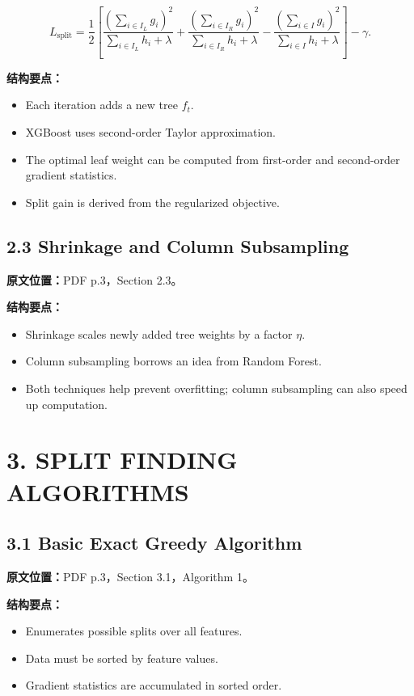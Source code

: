 \[
  L_{\mathrm{split}}
  =
  \frac{1}{2}
  \left[
    \frac{\left(\sum_{i\in I_L}g_i\right)^2}{\sum_{i\in I_L}h_i+\lambda}
    +
    \frac{\left(\sum_{i\in I_R}g_i\right)^2}{\sum_{i\in I_R}h_i+\lambda}
    -
    \frac{\left(\sum_{i\in I}g_i\right)^2}{\sum_{i\in I}h_i+\lambda}
  \right]
  -
  \gamma.
\]

\textbf{结构要点：}
\begin{itemize}
  \item Each iteration adds a new tree $f_t$.
  \item XGBoost uses second-order Taylor approximation.
  \item The optimal leaf weight can be computed from first-order and second-order gradient statistics.
  \item Split gain is derived from the regularized objective.
\end{itemize}

\subsection{2.3 Shrinkage and Column Subsampling}

\textbf{原文位置：}PDF p.3，Section 2.3。

\textbf{结构要点：}
\begin{itemize}
  \item Shrinkage scales newly added tree weights by a factor $\eta$.
  \item Column subsampling borrows an idea from Random Forest.
  \item Both techniques help prevent overfitting; column subsampling can also speed up computation.
\end{itemize}

\section{3. SPLIT FINDING ALGORITHMS}

\subsection{3.1 Basic Exact Greedy Algorithm}

\textbf{原文位置：}PDF p.3，Section 3.1，Algorithm 1。

\textbf{结构要点：}
\begin{itemize}
  \item Enumerates possible splits over all features.
  \item Data must be sorted by feature values.
  \item Gradient statistics are accumulated in sorted order.
\end{itemize}

